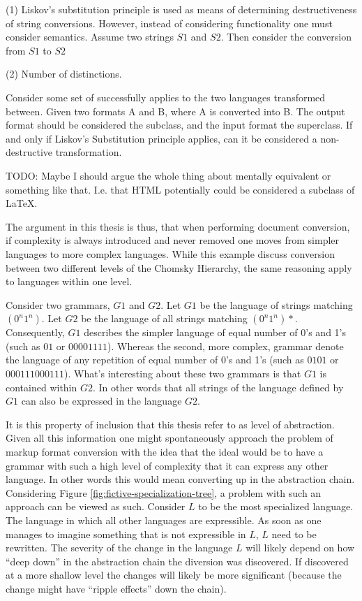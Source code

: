 \documentclass{scrreprt}
\begin{document}
(1)
Liskov's substitution principle is used as means of determining destructiveness of string conversions. However, instead of considering functionality one must consider semantics. Assume two strings $S1$ and $S2$. Then consider the conversion from $S1$ to $S2$

(2) Number of distinctions.


Consider some set of  successfully applies to the two languages transformed between. Given two formats A and B, where A is converted into B. The output format should be considered the subclass, and the input format the superclass. If and only if Liskov's Substitution principle applies, can it be considered a non-destructive transformation.

TODO: Maybe I should argue the whole thing about mentally equivalent or something like that. I.e. that HTML potentially could be considered a subclass of \LaTeX.


The argument in this thesis is thus, that when performing document conversion, if complexity is always introduced and never removed one moves from simpler languages to more complex languages. While this example discuss conversion between two different levels of the Chomsky Hierarchy, the same reasoning apply to languages within one level.

Consider two grammars, $G1$ and $G2$. Let $G1$ be the language of strings matching $(0^n 1^n)$. Let $G2$ be the language of all strings matching $(0^n 1^n)*$. Consequently, $G1$ describes the simpler language of equal number of 0's and 1's (such as $01$ or $00001111$). Whereas the second, more complex, grammar denote the language of any repetition of equal number of 0's and 1's (such as $0101$ or $000111000111$). What's interesting about these two grammars is that $G1$ is contained within $G2$. In other words that all strings of the language defined by $G1$ can also be expressed in the language $G2$.

It is this property of inclusion that this thesis refer to as level of abstraction. Given all this information one might spontaneously approach the problem of markup format conversion with the idea that the ideal would be to have a grammar with such a high level of complexity that it can express any other language. In other words this would mean converting up in the abstraction chain. Considering Figure \ref{fig:fictive-specialization-tree}, a problem with such an approach can be viewed as such. Consider $L$ to be the most specialized language. The language in which all other languages are expressible. As soon as one manages to imagine something that is not expressible in $L$, $L$ need to be rewritten. The severity of the change in the language $L$ will likely depend on how ``deep down'' in the abstraction chain the diversion was discovered. If discovered at a more shallow level the changes will likely be more significant (because the change might have ``ripple effects'' down the chain).
\end{document}
